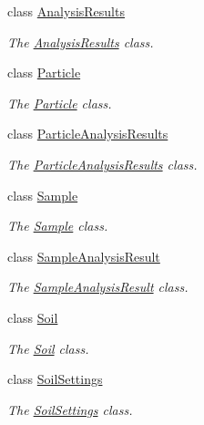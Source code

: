\begin{DoxyCompactItemize}
\item 
class \hyperlink{class_soil_analyzer_1_1_analysis_results}{Analysis\+Results}
\begin{DoxyCompactList}\small\item\em The \hyperlink{class_soil_analyzer_1_1_analysis_results}{Analysis\+Results} class. \end{DoxyCompactList}\item 
class \hyperlink{class_soil_analyzer_1_1_particle}{Particle}
\begin{DoxyCompactList}\small\item\em The \hyperlink{class_soil_analyzer_1_1_particle}{Particle} class. \end{DoxyCompactList}\item 
class \hyperlink{class_soil_analyzer_1_1_particle_analysis_results}{Particle\+Analysis\+Results}
\begin{DoxyCompactList}\small\item\em The \hyperlink{class_soil_analyzer_1_1_particle_analysis_results}{Particle\+Analysis\+Results} class. \end{DoxyCompactList}\item 
class \hyperlink{class_soil_analyzer_1_1_sample}{Sample}
\begin{DoxyCompactList}\small\item\em The \hyperlink{class_soil_analyzer_1_1_sample}{Sample} class. \end{DoxyCompactList}\item 
class \hyperlink{class_soil_analyzer_1_1_sample_analysis_result}{Sample\+Analysis\+Result}
\begin{DoxyCompactList}\small\item\em The \hyperlink{class_soil_analyzer_1_1_sample_analysis_result}{Sample\+Analysis\+Result} class. \end{DoxyCompactList}\item 
class \hyperlink{class_soil_analyzer_1_1_soil}{Soil}
\begin{DoxyCompactList}\small\item\em The \hyperlink{class_soil_analyzer_1_1_soil}{Soil} class. \end{DoxyCompactList}\item 
class \hyperlink{class_soil_analyzer_1_1_soil_settings}{Soil\+Settings}
\begin{DoxyCompactList}\small\item\em The \hyperlink{class_soil_analyzer_1_1_soil_settings}{Soil\+Settings} class. \end{DoxyCompactList}\end{DoxyCompactItemize}
